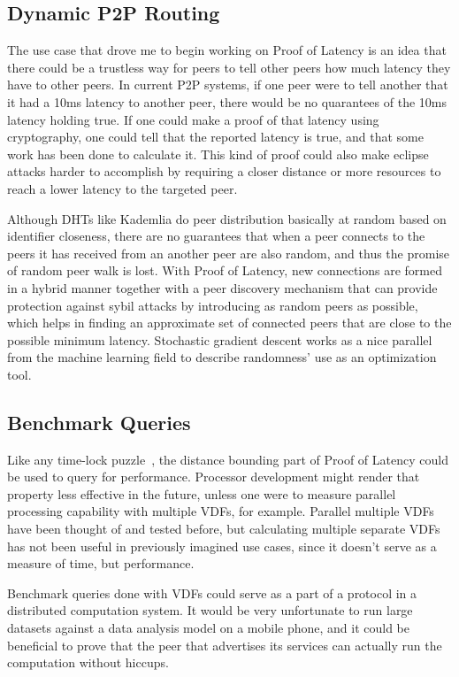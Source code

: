 \subsection{Dynamic P2P Routing}
The use case that drove me to begin working on Proof of Latency is an idea that there could be a trustless way for peers to tell other peers how much latency they have to other peers. In current P2P systems, if one peer were to tell another that it had a 10ms latency to another peer, there would be no quarantees of the 10ms latency holding true. If one could make a proof of that latency using cryptography, one could tell that the reported latency is true, and that some work has been done to calculate it. This kind of proof could also make eclipse attacks harder to accomplish by requiring a closer distance or more resources to reach a lower latency to the targeted peer.

Although DHTs like Kademlia do peer distribution basically at random based on identifier closeness, there are no guarantees that when a peer connects to the peers it has received from an another peer are also random, and thus the promise of random peer walk is lost. With Proof of Latency, new connections are formed in a hybrid manner together with a peer discovery mechanism that can provide protection against sybil attacks by introducing as random peers as possible, which helps in finding an approximate set of connected peers that are close to the possible minimum latency. Stochastic gradient descent works as a nice parallel from the machine learning field to describe randomness' use as an optimization tool.

\subsection{Benchmark Queries}
Like any time-lock puzzle~\cite{Mahmoody2013-zi}, the distance bounding part of Proof of Latency could be used to query for performance. Processor development might render that property less effective in the future, unless one were to measure parallel processing capability with multiple VDFs, for example. Parallel multiple VDFs have been thought of and tested before, but calculating multiple separate VDFs has not been useful in previously imagined use cases, since it doesn't serve as a measure of time, but performance.

Benchmark queries done with VDFs could serve as a part of a protocol in a distributed computation system. It would be very unfortunate to run large datasets against a data analysis model on a mobile phone, and it could be beneficial to prove that the peer that advertises its services can actually run the computation without hiccups.

